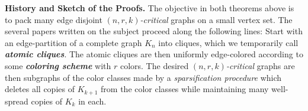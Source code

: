 \documentclass[12pt]{article}
\newtheorem{theorem}{Theorem}
\newtheorem{corollary}{Corollary}
\theoremstyle{definition}
\begin{document}
	\iffalse
	\textbf{History and Sketch of the Proofs.}
	The objective in both theorems above is to pack many edge disjoint  $(n,r,k)$\textit{-critical} graphs on a small vertex set. The several papers written on the subject proceed along the following lines: Start with an edge-partition of a complete graph $K_n$ into cliques, which we temporarily call \textit{\textbf{atomic cliques}}. The atomic cliques are then uniformly edge-colored according to some \textit{\textbf{coloring scheme}} with $r$ colors. The desired $(n,r,k)$\textit{-critical} graphs are then subgraphs of the color classes made by a \emph{sparsification procedure} which deletes all copies of $K_{k+1}$ from the color classes while maintaining many well-spread copies of $K_k$ in each.\\
	
\end{document}
